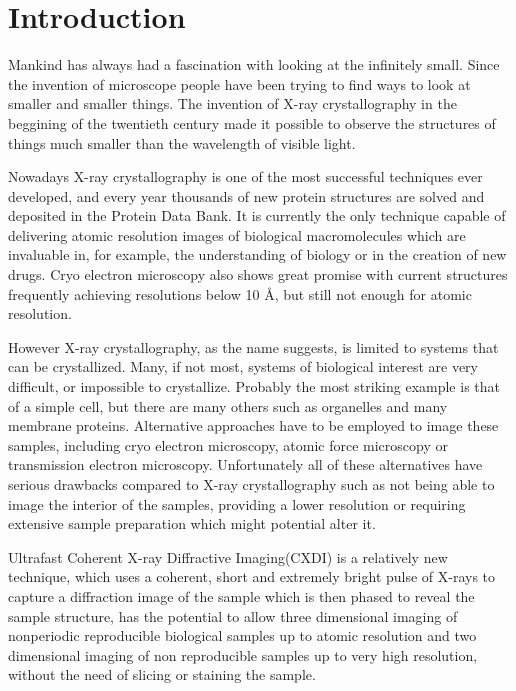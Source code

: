 \chapter{Introduction}\label{introduction}\noindent

Mankind has always had a fascination with looking at the infinitely
small. Since the invention of microscope people have been trying to find ways to
look at smaller and smaller things. The invention of X-ray crystallography in
the beggining of the twentieth century made it possible to observe the
structures of things much smaller than the wavelength of visible light.

Nowadays X-ray crystallography is one of the most successful techniques ever
developed, and every year thousands of new protein structures are solved and deposited
in the Protein Data Bank. It is currently the only technique capable of
delivering atomic resolution images of biological macromolecules which are
invaluable in, for example, the understanding of biology or in the creation of
new drugs. Cryo electron microscopy also shows great promise with current
structures frequently achieving resolutions below 10 \AA, but still not enough
for atomic resolution.

However X-ray crystallography, as the name suggests, is limited to systems that
can be crystallized. Many, if not most, systems of biological interest are very
difficult, or impossible to crystallize. Probably the most striking example is
that of a simple cell, but there are many others such as organelles and many
membrane proteins. Alternative approaches have to be employed to image these
samples, including cryo electron microscopy, atomic force microscopy or
transmission electron microscopy. Unfortunately all of these alternatives have
serious drawbacks compared to X-ray crystallography such as not being able to
image the interior of the samples, providing a lower resolution or requiring
extensive sample preparation which might potential alter it.

Ultrafast Coherent X-ray Diffractive Imaging(CXDI) is a relatively new
technique, which uses a coherent, short and extremely
bright pulse of X-rays to capture a diffraction image of the sample which is
then phased to reveal the sample structure, has the potential to allow three
dimensional imaging of nonperiodic reproducible biological samples up to atomic
resolution and two dimensional imaging of non reproducible samples up to
very high resolution, without the need of slicing or staining the sample.

